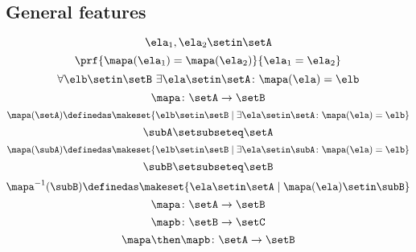 \begin{forslides}
\subsection{General features}

\begin{equation}\label{eq:slides_session2_122}
\ela_1, \ela_2 \setin\setA
\end{equation}
\begin{equation}\label{eq:slides_session2_123}
\prf{\mapa(\ela_1) = \mapa(\ela_2)}{\ela_1 = \ela_2}
\end{equation}
\begin{equation}\label{eq:slides_session2_124}
\forall \elb \setin\setB \ \exists  \ela \setin\setA \colon \mapa(\ela) = \elb
\end{equation}
\begin{equation}\label{eq:slides_session2_125}
\mapa\colon \setA \to \setB
\end{equation}
\begin{equation}\label{eq:slides_session2_126}
\mapa(\setA) \definedas \makeset{ \elb \setin\setB \mid \exists \ela \setin\setA \colon \mapa(\ela) = \elb }
\end{equation}
\begin{equation}\label{eq:slides_session2_127}
\subA \setsubseteq \setA
\end{equation}
\begin{equation}\label{eq:slides_session2_128}
\mapa(\subA) \definedas \makeset{ \elb \setin\setB \mid \exists \ela \setin \subA \colon \mapa(\ela) = \elb }
\end{equation}
\begin{equation}\label{eq:slides_session2_129}
\subB \setsubseteq \setB
\end{equation}
\begin{equation}\label{eq:slides_session2_130}
\mapa^{-1}(\subB) \definedas \makeset{ \ela \setin\setA \mid  \mapa(\ela) \setin \subB} 
\end{equation}
\begin{equation}\label{eq:slides_session2_131}
\mapa\colon \setA \to \setB
\end{equation}
\begin{equation}\label{eq:slides_session2_132}
\mapb \colon \setB \to \setC
\end{equation}
\begin{equation}\label{eq:slides_session2_133}
\mapa \then \mapb \colon \setA \to \setB
\end{equation}
\begin{equation}\label{eq:slides_session2_134}

\end{equation}
\end{forslides}
